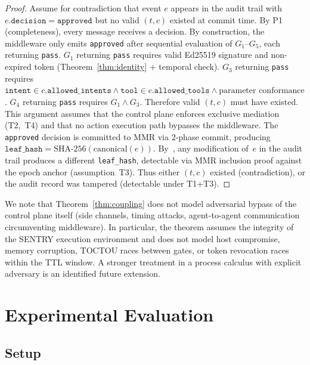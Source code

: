 \documentclass[11pt,a4paper]{article}
\begin{document}
\begin{proof}
Assume for contradiction that event $e$ appears in the audit trail with $e.\texttt{decision} =
\texttt{approved}$ but no valid $(t,c)$ existed at commit time. By P1 (completeness), every
message receives a decision. By construction, the middleware only emits \texttt{approved} after
sequential evaluation of $G_1$--$G_5$, each returning \texttt{pass}. $G_1$ returning
\texttt{pass} requires valid Ed25519 signature and non-expired token
(Theorem~\ref{thm:identity} + temporal check). $G_3$ returning \texttt{pass} requires
$\texttt{intent} \in c.\texttt{allowed\_intents} \wedge \texttt{tool} \in
c.\texttt{allowed\_tools} \wedge \text{parameter conformance}$. $G_4$ returning \texttt{pass}
requires $G_1 \wedge G_3$. Therefore valid $(t,c)$ must have existed. This argument assumes
that the control plane enforces exclusive mediation (T2,~T4) and that no action execution path
bypasses the middleware. The \texttt{approved}
decision is committed to MMR via 2-phase commit, producing $\texttt{leaf\_hash} =
\text{SHA-256}(\text{canonical}(e))$. By~\cite[Theorem~1]{licitrammr}, any modification of~$e$
in the audit trail produces a different \texttt{leaf\_hash}, detectable via MMR inclusion proof
against the epoch anchor (assumption~T3). Thus either $(t,c)$ existed (contradiction), or the
audit record was tampered (detectable under T1+T3).
\end{proof}

We note that Theorem~\ref{thm:coupling} does not model adversarial bypass of the control plane
itself (side channels, timing attacks, agent-to-agent communication circumventing middleware).
In particular, the theorem assumes the integrity of the SENTRY execution environment and does
not model host compromise, memory corruption, TOCTOU races between gates, or token revocation
races within the TTL window. A stronger treatment in a process calculus with explicit adversary
is an identified future extension.


\section{Experimental Evaluation}\label{sec:experiments}

\subsection{Setup}
\end{document}
